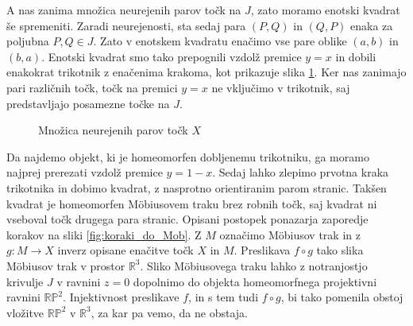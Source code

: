 \documentclass[mat1]{fmfdelo}
\newcommand{\R}{\mathbb R}
\newcommand{\arrows}[5][]{
  \draw[->, #1] (#2, #3) -- (0.75*#2 + 0.25*#4, 0.75*#3 + 0.25*#5);
  \draw[->, #1] (0.75*#2 + 0.25*#4, 0.75*#3 + 0.25*#5) -- (0.5*#2 + 0.5*#4, 0.5*#3 + 0.5*#5);
  \draw[->, #1] (0.5*#2 + 0.5*#4, 0.5*#3 + 0.5*#5) -- (0.25*#2 + 0.75*#4, 0.25*#3 + 0.75*#5);
  \draw[->, #1] (0.25*#2 + 0.75*#4, 0.25*#3 + 0.75*#5) -- (#4, #5);
}
\begin{document}
A nas zanima množica neurejenih parov točk na $J$, zato moramo enotski kvadrat še spremeniti. Zaradi neurejenosti, sta sedaj para $(P, Q)$ in $(Q, P)$ enaka za poljubna $P, Q \in J$. Zato v enotskem kvadratu enačimo vse pare oblike $(a, b)$ in $(b, a)$. Enotski kvadrat smo tako prepognili vzdolž premice $y = x$ in dobili enakokrat trikotnik z enačenima krakoma, kot prikazuje slika \ref{fig:prvi_pregib}. Ker nas zanimajo pari različnih točk, točk na premici $y = x$ ne vključimo v trikotnik, saj predstavljajo posamezne točke na $J$. 

\begin{figure}[h!]
\caption{Množica neurejenih parov točk $X$}
\label{fig:prvi_pregib}
\end{figure}

Da najdemo objekt, ki je homeomorfen dobljenemu trikotniku, ga moramo najprej prerezati vzdolž premice $y = 1 - x$. Sedaj lahko zlepimo prvotna kraka trikotnika in dobimo kvadrat, z nasprotno orientiranim parom stranic. Takšen kvadrat je homeomorfen M\"obiusovem traku brez robnih točk, saj kvadrat ni vseboval točk drugega para stranic. Opisani postopek ponazarja zaporedje korakov na sliki \ref{fig:koraki_do_Mob}. Z $M$ označimo M\"obiusov trak in z $g \colon M \to X$ inverz opisane enačitve točk $X$ in $M$. Preslikava $f \circ g$ tako slika M\"obiusov trak v prostor $\R^3$. Sliko M\"obiusovega traku lahko z notranjostjo krivulje $J$ v ravnini $z=0$ dopolnimo do objekta homeomorfnega projektivni ravnini $\R \mathbb{P} ^2$. Injektivnost preslikave $f$, in s tem tudi $f \circ g$, bi tako pomenila obstoj vložitve $\R\mathbb{P}^2$ v $\R^3$, za kar pa vemo, da ne obstaja.
\end{document}
